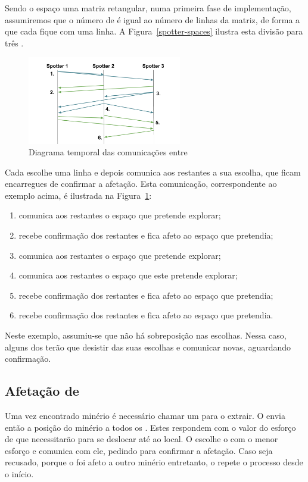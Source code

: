 \documentclass[12pt]{report}
\begin{document}
Sendo o espaço uma matriz retangular, numa primeira fase de implementação, assumiremos que o número de \spotters é igual ao número de linhas da matriz, de forma a que cada \spotter fique com uma linha. A Figura~\ref{spotter-spaces} ilustra esta divisão para três \spotters.

\begin{figure}[h]
	\centering
    \includegraphics[width=0.6\textwidth]{spotter-agreement}
	\caption{Diagrama temporal das comunicações entre \spotters}
	\label{spotter-agreement}
\end{figure}  

Cada \spotter escolhe uma linha e depois comunica aos restantes a sua escolha, que ficam encarregues de confirmar a afetação. Esta comunicação, correspondente ao exemplo acima, é ilustrada na Figura~\ref{spotter-agreement}:
\begin{enumerate}
	\item {} comunica aos restantes o espaço que pretende explorar;
    \item {} recebe confirmação dos restantes e fica afeto ao espaço que pretendia;
    \item {} comunica aos restantes o espaço que pretende explorar;
    \item {} comunica aos restantes o espaço que este pretende explorar;
    \item {} recebe confirmação dos restantes e fica afeto ao espaço que pretendia;
    \item {} recebe confirmação dos restantes e fica afeto ao espaço que pretendia.
\end{enumerate}

Neste exemplo, assumiu-se que não há sobreposição nas escolhas. Nessa caso, alguns dos \spotters terão que desistir das suas escolhas e comunicar novas, aguardando confirmação.

\FloatBarrier
\subsection{Afetação de \producers}
Uma vez encontrado minério é necessário chamar um \producer para o extrair. O \spotter envia então a posição do  minério a todos os \producers. 
Estes respondem com o valor do esforço de que necessitarão para se deslocar até ao local. 
O \spotter escolhe o \producer com o menor esforço e comunica com ele, pedindo para confirmar a afetação. 
Caso seja recusado, porque o \producer foi afeto a outro minério entretanto, o \spotter repete o processo desde o início.
\end{document}
